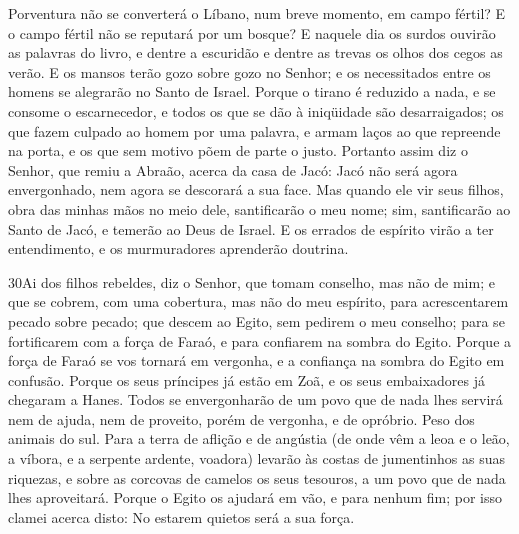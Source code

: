 Porventura não se converterá o Líbano, num breve momento, em
campo fértil? E o campo fértil não se reputará por um bosque?
E naquele dia os surdos ouvirão as palavras do livro, e
dentre a escuridão e dentre as trevas os olhos dos cegos as verão.
E os mansos terão gozo sobre gozo no Senhor; e os
necessitados entre os homens se alegrarão no Santo de Israel.
Porque o tirano é reduzido a nada, e se consome o
escarnecedor, e todos os que se dão à iniqüidade são desarraigados;
os que fazem culpado ao homem por uma palavra, e armam laços
ao que repreende na porta, e os que sem motivo põem de parte o
justo. Portanto assim diz o Senhor, que remiu a Abraão,
acerca da casa de Jacó: Jacó não será agora envergonhado, nem agora
se descorará a sua face. Mas quando ele vir seus filhos, obra
das minhas mãos no meio dele, santificarão o meu nome; sim,
santificarão ao Santo de Jacó, e temerão ao Deus de Israel. E
os errados de espírito virão a ter entendimento, e os murmuradores
aprenderão doutrina.

\medskip

\lettrine{30}{}Ai dos filhos rebeldes, diz o Senhor, que tomam
conselho, mas não de mim; e que se cobrem, com uma cobertura, mas
não do meu espírito, para acrescentarem pecado sobre pecado; que
descem ao Egito, sem pedirem o meu conselho; para se fortificarem
com a força de Faraó, e para confiarem na sombra do Egito.
Porque a força de Faraó se vos tornará em vergonha, e a
confiança na sombra do Egito em confusão. Porque os seus
príncipes já estão em Zoã, e os seus embaixadores já chegaram a
Hanes. Todos se envergonharão de um povo que de nada lhes
servirá nem de ajuda, nem de proveito, porém de vergonha, e de
opróbrio. Peso dos animais do sul. Para a terra de aflição e de
angústia (de onde vêm a leoa e o leão, a víbora, e a serpente
ardente, voadora) levarão às costas de jumentinhos as suas riquezas,
e sobre as corcovas de camelos os seus tesouros, a um povo que de
nada lhes aproveitará. Porque o Egito os ajudará em vão, e para
nenhum fim; por isso clamei acerca disto: No estarem quietos será a
sua força.

